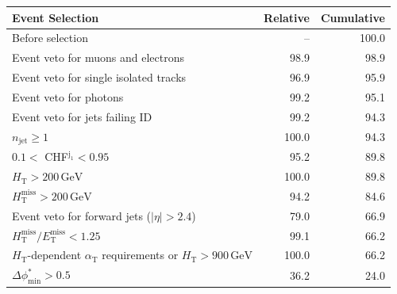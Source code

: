 \begin{table}[p]
    \begin{center}
        \begin{tabular}{lrr}
      \hline
                                                                                               Event Selection &  Relative &  Cumulative \\
      \hline
                                                                                             Before selection  &         -- &      100.0 \\
                                                                            Event veto for muons and electrons &       98.9 &       98.9 \\
                                                                         Event veto for single isolated tracks &       96.9 &       95.9 \\
                                                                                        Event veto for photons &       99.2 &       95.1 \\
                                                                                Event veto for jets failing ID &       99.2 &       94.3 \\
                                                                                     $n_{\mathrm{jet}} \geq 1$ &      100.0 &       94.3 \\
                                                                           $0.1 <$ CHF$^{\mathrm{j_1}} < 0.95$ &       95.2 &       89.8 \\
                                                                          $H_{\mathrm{T}} > 200\,\mathrm{GeV}$ &      100.0 &       89.8 \\
                                                          $H_{\mathrm{T}}^{\mathrm{miss}} > 200\,\mathrm{GeV}$ &       94.2 &       84.6 \\
                                                                  Event veto for forward jets ($|\eta| > 2.4$) &       79.0 &       66.9 \\
                                      $H_{\mathrm{T}}^{\mathrm{miss}} / E_{\mathrm{T}}^{\mathrm{miss}} < 1.25$ &       99.1 &       66.2 \\
         $H_{\mathrm{T}}$-dependent $\alpha_{\mathrm{T}}$ requirements or $H_{\mathrm{T}} > 900\,\mathrm{GeV}$ &      100.0 &       66.2 \\
                                                                         $\Delta\phi^{*}_{\mathrm{min}} > 0.5$ &       36.2 &       24.0 \\

\end{tabular}
\end{center}
\end{table}
